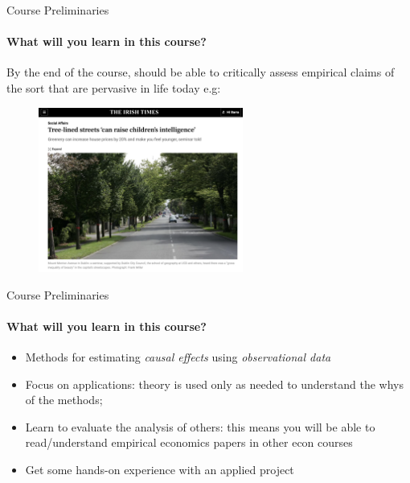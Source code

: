 \documentclass[11pt,english]{beamer}
\begin{document}
\begin{frame}{Course Preliminaries}
	\framesubtitle{What will you learn in this course?}
	\vspace{0.5cm}
	By the end of the course, should be able to critically assess empirical claims of the sort that are pervasive in life today e.g:
	\pause 
	\begin{figure}
		\centering
		\includegraphics[width=0.6\textwidth, trim=0 0 0 0, clip]{tree-lined-streets.png} %
	\end{figure}
	
	\end{frame}
	
\begin{frame}{Course Preliminaries}
	\framesubtitle{What will you learn in this course?}
	\begin{itemize}
		\item Methods for estimating \textit{causal effects} using \textit{observational data} \pause 
		\item Focus on applications: theory is used only as needed to understand the whys of the methods; \pause 
		\item Learn to evaluate the analysis of others: this means you will be able to read/understand empirical economics papers in other econ courses \pause 
		\item Get some hands-on experience with an applied project  
		
	\end{itemize}


\end{frame}
\end{document}
